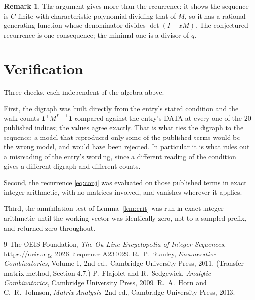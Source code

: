 \documentclass[11pt,a4paper]{article}
\theoremstyle{plain}
\theoremstyle{definition}
\newtheorem{remark}[theorem]{Remark}
\begin{document}
\begin{remark}
The argument gives more than the recurrence: it shows the sequence is $C$-finite with
characteristic polynomial dividing that of $M$, so it has a rational generating function
whose denominator divides $\det(I-xM)$. The conjectured recurrence is one consequence; the
minimal one is a divisor of $q$.
\end{remark}

\section{Verification}

Three checks, each independent of the algebra above.

First, the digraph was built directly from the entry's stated condition and the walk counts
$\mathbf{1}^{\!\top}M^{L-1}\mathbf{1}$ compared against the entry's DATA at
every one of the $20$ published indices; the values agree exactly. That is what ties
the digraph to the sequence: a model that reproduced only some of the published terms would
be the wrong model, and would have been rejected. In particular it is what rules out a
misreading of the entry's wording, since a different reading of the condition gives a
different digraph and different counts.

Second, the recurrence \eqref{eq:conj} was evaluated on those published terms in exact
integer arithmetic, with no matrices involved, and vanishes wherever it applies.

Third, the annihilation test of Lemma~\ref{lem:crit} was run in exact integer arithmetic
until the working vector was identically zero, not to a sampled prefix, and returned zero
throughout.

\begin{thebibliography}{9}
 The OEIS Foundation, \emph{The On-Line Encyclopedia of Integer
Sequences}, \url{https://oeis.org}, 2026. Sequence A234029.
 R.~P.~Stanley, \emph{Enumerative Combinatorics}, Volume 1, 2nd ed.,
Cambridge University Press, 2011. (Transfer-matrix method, Section 4.7.)
 P.~Flajolet and R.~Sedgewick, \emph{Analytic Combinatorics}, Cambridge
University Press, 2009.
 R.~A.~Horn and C.~R.~Johnson, \emph{Matrix Analysis}, 2nd ed., Cambridge
University Press, 2013.
\end{thebibliography}
\end{document}
